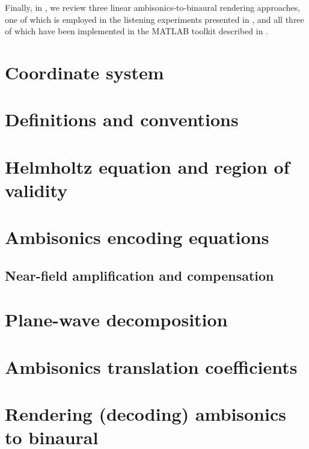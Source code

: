 Finally, in , we review three linear ambisonics-to-binaural rendering approaches, one of which is employed in the listening experiments presented in , and all three of which have been implemented in the MATLAB toolkit described in .

\section{Coordinate system}\label{sec:02_Acoustical_Theory:Coordinate_System}


\section{Definitions and conventions}\label{sec:02_Acoustical_Theory:Definitions}




\section{Helmholtz equation and region of validity}\label{sec:02_Acoustical_Theory:Helmholtz_Equation}


\section{Ambisonics encoding equations}\label{sec:02_Acoustical_Theory:Ambisonics_Encoding}


\subsection{Near-field amplification and compensation}\label{sec:02_Acoustical_Theory_Nearfield_Compensation}


\section{Plane-wave decomposition}\label{sec:02_Acoustical_Theory:Plane-Wave_Expansion}


\section{Ambisonics translation coefficients}\label{sec:02_Acoustical_Theory:Ambisonics_Translation}


\section{Rendering (decoding) ambisonics to binaural}\label{sec:02_Acoustical_Theory:Binaural_Rendering}
